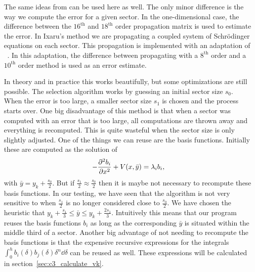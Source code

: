The same ideas from \matslise{} can be used here as well. The only minor difference is the way we compute the error for a given sector. In the one-dimensional case, the difference between the $16^\text{th}$ and $18^\text{th}$ order propagation matrix is used to estimate the error. In Ixaru's method we are propagating a coupled system of Schrödinger equations on each sector. This propagation is implemented with an adaptation of \matscs{}~\cite{ledoux_numerical_2007}. In this adaptation, the difference between propagating with a $8^\text{th}$ order and a $10^\text{th}$ order method is used as an error estimate.

In theory and in practice this works beautifully, but some optimizations are still possible. The selection algorithm works by guessing an initial sector size $s_0$. When the error is too large, a smaller sector size $s_1$ is chosen and the process starts over. One big disadvantage of this method is that when a sector was computed with an error that is too large, all computations are thrown away and everything is recomputed. This is quite wasteful when the sector size is only slightly adjusted. One of the things we can reuse are the basis functions. Initially these are computed as the solution of
$$
  -\pdv[2]{b_i}{x} + V(x, \bar{y}) = \lambda_i b_i\text{,}
$$
with $\bar{y} = y_{k} + \frac{s_0}{2}$. But if $\frac{s_1}{2} \approx \frac{s_0}{2}$ then it is maybe not necessary to recompute these basis functions. In our testing, we have seen that the algorithm is not very sensitive to when $\frac{s_1}{2}$ is no longer considered close to $\frac{s_0}{2}$. We have chosen the heuristic that $y_k + \frac{s_1}{3} \leq \bar{y} \leq y_k + \frac{2 s_1}{3}$. Intuitively this means that our program reuses the basis functions $b_i$ as long as the corresponding $\bar{y}$ is situated within the middle third of a sector. Another big advantage of not needing to recompute the basis functions is that the expensive recursive expressions for the integrals $\int_{0}^{h} b_i(\delta)b_j(\delta)\delta^n \dd \delta $ can be reused as well. These expressions will be calculated in section~\ref{sec:c3_calculate_vk}.

